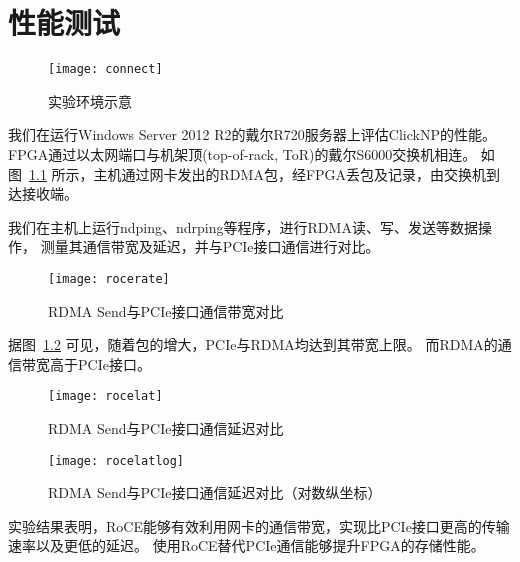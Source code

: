 \chapter{性能测试}
\begin{figure}[htbp]
\centering
\texttt{[image: connect]}
\caption{实验环境示意} \label{fig:connect}
\end{figure}
我们在运行Windows Server 2012 R2的戴尔R720服务器上评估ClickNP的性能。
FPGA通过以太网端口与机架顶(top-of-rack, ToR)的戴尔S6000交换机\cite{s6000}相连。
如图~\ref{fig:connect} 所示，主机通过网卡发出的RDMA包，经FPGA丢包及记录，由交换机到达接收端。

我们在主机上运行ndping、ndrping等程序，进行RDMA读、写、发送等数据操作，
测量其通信带宽及延迟，并与PCIe接口通信进行对比。

\begin{figure}[htbp]
\centering
\texttt{[image: rocerate]}
\caption{RDMA Send与PCIe接口通信带宽对比} \label{fig:rocerate}
\end{figure}

据图~\ref{fig:rocerate} 可见，随着包的增大，PCIe与RDMA均达到其带宽上限。
而RDMA的通信带宽高于PCIe接口。

\begin{figure}[htbp]
\centering
\texttt{[image: rocelat]}
\caption{RDMA Send与PCIe接口通信延迟对比} \label{fig:rocelat}
\end{figure}

\begin{figure}[htbp]
\centering
\texttt{[image: rocelatlog]}
\caption{RDMA Send与PCIe接口通信延迟对比（对数纵坐标）} \label{fig:rocelatlog}
\end{figure}

实验结果表明，RoCE能够有效利用网卡的通信带宽，实现比PCIe接口更高的传输速率以及更低的延迟。
使用RoCE替代PCIe通信能够提升FPGA的存储性能。
